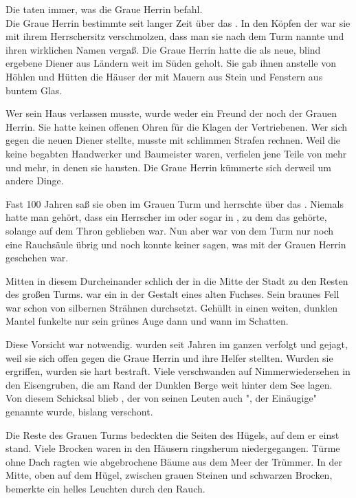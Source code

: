 \begin{huge}
Die {\Bangiri} taten immer, was die Graue Herrin befahl.\\
Die Graue Herrin bestimmte seit langer Zeit über das {\Enland}. In den Köpfen der {\Enlaender} war sie mit ihrem Herrschersitz verschmolzen, dass man sie nach dem Turm nannte und ihren wirklichen Namen vergaß. Die Graue Herrin hatte die {\Bangiri} als neue, blind ergebene Diener aus Ländern weit im Süden geholt. Sie gab ihnen anstelle von Höhlen und Hütten die Häuser der {\Enlaender} mit Mauern aus Stein und Fenstern aus buntem Glas. 

Wer sein Haus verlassen musste, wurde weder ein Freund der {\Bangiri} noch der Grauen Herrin. Sie hatte keinen offenen Ohren für die Klagen der Vertriebenen. Wer sich gegen die neuen Diener stellte, musste mit schlimmen Strafen rechnen. Weil die \Bangiri keine begabten Handwerker und Baumeister waren, verfielen jene Teile von {\Tern} mehr und mehr, in denen sie hausten. Die Graue Herrin kümmerte sich derweil um andere Dinge. 

Fast 100 Jahren saß sie oben im Grauen Turm und herrschte über das {\Enland}. Niemals hatte man gehört, dass ein Herrscher im {\Enland} oder sogar in {\Rhingell}, zu dem das {\Enland} gehörte, solange auf dem Thron geblieben war. Nun aber war von dem Turm nur noch eine Rauchsäule übrig und noch konnte keiner sagen, was mit der Grauen Herrin geschehen war. 

Mitten in diesem Durcheinander schlich {\Eno} der {\Schattenlaufer} in die Mitte der Stadt zu den Resten des großen Turms. {\Eno} war ein {\Enlaender} in der Gestalt eines alten Fuchses. Sein braunes Fell war schon von silbernen Strähnen durchsetzt. Gehüllt in einen weiten, dunklen Mantel funkelte nur sein grünes Auge dann und wann im Schatten. 

Diese Vorsicht war notwendig. {\Schattenlaufer} wurden seit Jahren im ganzen {\Enland} verfolgt und gejagt, weil sie sich offen gegen die Graue Herrin und ihre Helfer stellten. Wurden sie ergriffen, wurden sie hart bestraft. Viele verschwanden auf Nimmerwiedersehen in den Eisengruben, die am Rand der Dunklen Berge weit hinter dem See lagen.\\
Von diesem Schicksal blieb {\Eno}, der von seinen Leuten auch "{\Eno}, der Einäugige" genannte wurde, bislang verschont. 

Die Reste des Grauen Turms bedeckten die Seiten des Hügels, auf dem er einst stand. Viele Brocken waren in den Häusern ringsherum niedergegangen. Türme ohne Dach ragten wie abgebrochene Bäume aus dem Meer der Trümmer. In der Mitte, oben auf dem Hügel, zwischen grauen Steinen und schwarzen Brocken, bemerkte {\Eno} ein helles Leuchten durch den Rauch. 


\end{huge}
